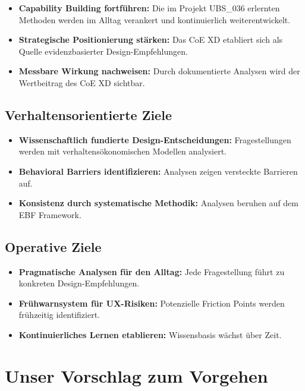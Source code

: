 \documentclass[11pt,a4paper]{article}
\begin{document}
\begin{itemize}
    \item[$\checkmark$] \textbf{Capability Building fortführen:} Die im Projekt UBS\_036 erlernten Methoden werden im Alltag verankert und kontinuierlich weiterentwickelt.
    \item[$\checkmark$] \textbf{Strategische Positionierung stärken:} Das CoE XD etabliert sich als Quelle evidenzbasierter Design-Empfehlungen.
    \item[$\checkmark$] \textbf{Messbare Wirkung nachweisen:} Durch dokumentierte Analysen wird der Wertbeitrag des CoE XD sichtbar.
\end{itemize}

\subsection{Verhaltensorientierte Ziele}

\begin{itemize}
    \item[$\checkmark$] \textbf{Wissenschaftlich fundierte Design-Entscheidungen:} Fragestellungen werden mit verhaltensökonomischen Modellen analysiert.
    \item[$\checkmark$] \textbf{Behavioral Barriers identifizieren:} Analysen zeigen versteckte Barrieren auf.
    \item[$\checkmark$] \textbf{Konsistenz durch systematische Methodik:} Analysen beruhen auf dem EBF Framework.
\end{itemize}

\subsection{Operative Ziele}

\begin{itemize}
    \item[$\checkmark$] \textbf{Pragmatische Analysen für den Alltag:} Jede Fragestellung führt zu konkreten Design-Empfehlungen.
    \item[$\checkmark$] \textbf{Frühwarnsystem für UX-Risiken:} Potenzielle Friction Points werden frühzeitig identifiziert.
    \item[$\checkmark$] \textbf{Kontinuierliches Lernen etablieren:} Wissensbasis wächst über Zeit.
\end{itemize}

\newpage
\section{Unser Vorschlag zum Vorgehen}
\end{document}
